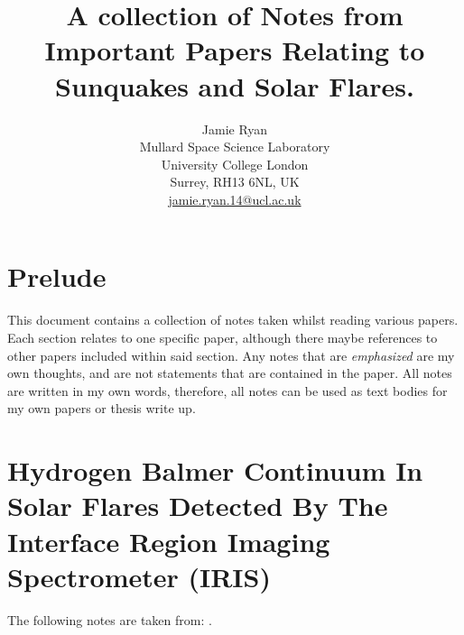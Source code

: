 \documentclass[11pt]{article}
\title{A collection of Notes from Important Papers Relating to Sunquakes and Solar Flares.}
\author{Jamie Ryan \\
Mullard Space Science Laboratory \\
University College London \\
Surrey, RH13 6NL, UK\\
\href{mailto:jamie.ryan.14@ucl.ac.uk}{jamie.ryan.14@ucl.ac.uk}
\date{}}
\begin{document}
\maketitle
\tableofcontents

\section{Prelude}
This document contains a collection of notes taken whilst reading various papers. Each section relates to one specific paper, although there maybe references to other papers included within said section. Any notes that are \emph{emphasized} are my own thoughts, and are not statements that are contained in the paper. All notes are written in my own words, therefore, all notes can be used as text bodies for my own papers or thesis write up.


\section{Hydrogen Balmer Continuum In Solar Flares Detected By The Interface Region Imaging Spectrometer (IRIS)}
The following notes are taken from: \cite{2014ApJ...794L..23H}. \\
\end{document}
